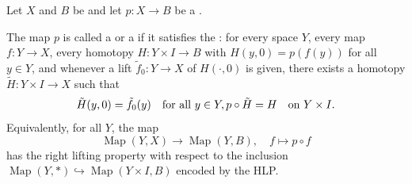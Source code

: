 \begin{definition} \label{definition:fibration_of_topological_spaces}
Let $X$ and $B$ be  and let $p:X \to B$ be a . 

The map $p$ is called a  or a  if it satisfies the : for every space $Y$, every map $f:Y \to X$, every homotopy $H:Y \times I \to B$ with $H(y,0) = p(f(y))$ for all $y \in Y$, and whenever a lift $\tilde f_0:Y \to X$ of $H(\cdot,0)$ is given, there exists a homotopy $\tilde H:Y \times I \to X$ such that
$$
\tilde H(y,0) = \tilde f_0(y) \quad \text{for all } y \in Y,\\
p \circ \tilde H = H \quad \text{on } Y \times I.
$$
Equivalently, for all $Y$, the map
\[
\operatorname{Map}(Y,X) \to \operatorname{Map}(Y,B),\quad f \mapsto p \circ f
\]
has the right lifting property with respect to the inclusion $\operatorname{Map}(Y,\ast) \hookrightarrow \operatorname{Map}(Y \times I, B)$ encoded by the HLP.
\end{definition}